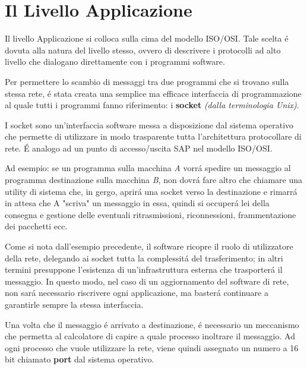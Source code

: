 \documentclass[12pt]{article}
\begin{document}
\date{}
\title{\vspace{-11ex}} %
 
\maketitle

\section{Il Livello Applicazione}\label{il-livello-applicazione}
Il livello Applicazione si colloca sulla cima del modello ISO/OSI. Tale scelta \'e dovuta alla natura del livello stesso,
ovvero di descrivere i protocolli ad alto livello che dialogano direttamente con i programmi software.

Per permettere lo scambio di messaggi tra due programmi che si trovano sulla stessa rete, \'e stata creata una semplice ma 
efficace interfaccia di programmazione al quale tutti i programmi fanno riferimento: i \textbf{socket} \textit{(dalla
terminologia Unix)}.

I socket sono un'interfaccia software messa a disposizione dal sistema operativo che permette di utilizzare in modo 
trasparente tutta l'architettura protocollare di rete. \'E analogo ad un punto di accesso/uscita SAP nel modello ISO/OSI.

Ad esempio: se un programma sulla macchina \textit{A} vorr\'a spedire un messaggio al programma destinazione sulla macchina 
\textit{B}, non dovr\'a fare altro che chiamare una utility di sistema che, in gergo, aprir\'a una socket verso la 
destinazione e rimarr\'a in attesa che A "scriva" un messaggio in essa, quindi si occuper\'a lei della consegna e gestione 
delle eventuali ritrasmissioni, riconnessioni, frammentazione dei pacchetti ecc.

Come si nota dall'esempio precedente, il software ricopre il ruolo di utilizzatore della rete, delegando ai socket tutta la 
complessit\'a del trasferimento; in altri termini presuppone l'esistenza di un'infrastruttura esterna che trasporter\'a il 
messaggio. In questo modo, nel caso di un aggiornamento del software di rete, non sar\'a necessario riscrivere ogni 
applicazione, ma baster\'a continuare a garantirle sempre la stessa interfaccia.

Una volta che il messaggio \'e arrivato a destinazione, \'e necessario un meccanismo che permetta al calcolatore di capire a 
quale processo inoltrare il messaggio. Ad ogni processo che vuole utilizzare la rete, viene quindi assegnato un numero a 16 
bit chiamato \textbf{port} dal sistema operativo.
\end{document}
